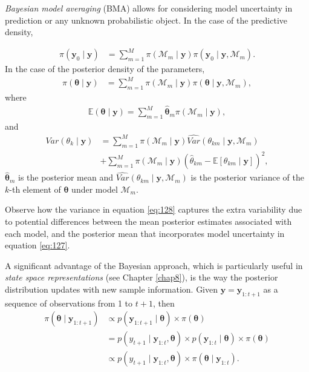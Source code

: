 \textit{Bayesian model averaging} (BMA) allows for considering model uncertainty in prediction or any unknown probabilistic object. In the case of the predictive density, 

\begin{align}
	\pi(\mathbf{y}_0\mid \mathbf{y})&=\sum_{m=1}^M \pi(\mathcal{M}_m\mid \mathbf{y})\pi(\mathbf{y}_0\mid \mathbf{y},\mathcal{M}_m).
\end{align}
In the case of the posterior density of the parameters,
\begin{align}
	\pi(\bm{\theta}\mid \mathbf{y})&=\sum_{m=1}^M \pi(\mathcal{M}_m\mid \mathbf{y})\pi(\bm{\theta}\mid \mathbf{y},\mathcal{M}_m),
\end{align}
where 
\begin{align}
	\mathbb{E}(\bm{\theta}\mid \mathbf{y})=\sum_{m=1}^{M}\hat{\bm{\theta}}_m \pi(\mathcal{M}_m\mid \mathbf{y}),
	\label{eq:127}
\end{align}
and
\begin{align}
	Var({\theta}_k\mid \mathbf{y}) &= \sum_{m=1}^{M}\pi(\mathcal{M}_m\mid \mathbf{y}) \widehat{Var} ({\theta}_{km}\mid \mathbf{y},\mathcal{M}_m)\nonumber\\
	&+\sum_{m=1}^{M} \pi(\mathcal{M}_m\mid \mathbf{y}) (\hat{{\theta}}_{km}-\mathbb{E}[{\theta}_{km}\mid \mathbf{y}])^2,
	\label{eq:128}
\end{align}
$\hat{\bm{\theta}}_m$ is the posterior mean and $\widehat{Var}({\theta}_{km}\mid \mathbf{y},\mathcal{M}_m)$ is the posterior variance of the $k$-th element of $\bm{\theta}$ under model $\mathcal{M}_m$.

Observe how the variance in equation \ref{eq:128} captures the extra variability due to potential differences between the mean posterior estimates associated with each model, and the posterior mean that incorporates model uncertainty in equation \ref{eq:127}.

A significant advantage of the Bayesian approach, which is particularly useful in \textit{state space representations} (see Chapter \ref{chap8}), is the way the posterior distribution updates with new sample information. Given $\mathbf{y} = \mathbf{y}_{1:t+1}$ as a sequence of observations from 1 to $t+1$, then
\begin{align}\label{equpdate}
	\pi(\bm{\theta}\mid \mathbf{y}_{1:t+1})&\propto p(\mathbf{y}_{1:t+1}\mid \bm{\theta})\times \pi(\bm{\theta})\nonumber\\
	&= p(y_{t+1}\mid \mathbf{y}_{1:t},\bm{\theta})\times p(\mathbf{y}_{1:t}\mid \bm{\theta})\times \pi(\bm{\theta})\nonumber\\
	&\propto p(y_{t+1}\mid \mathbf{y}_{1:t},\bm{\theta})\times \pi(\bm{\theta}\mid \mathbf{y}_{1:t}). 
\end{align}

